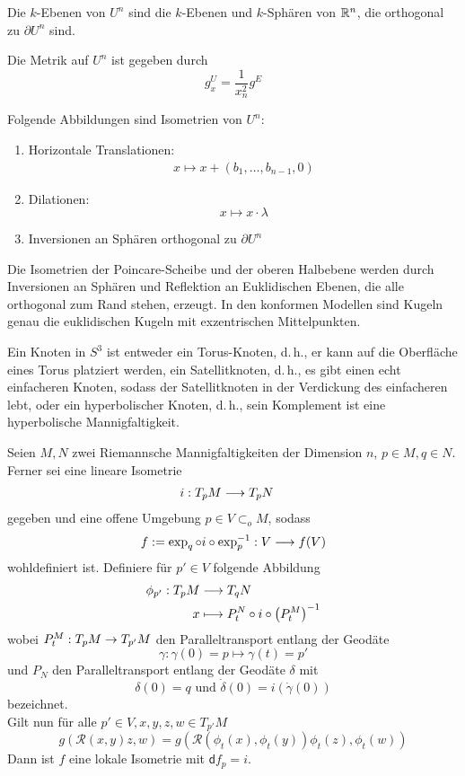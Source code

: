 \documentclass{book}
\renewcommand{\i}{^{-1}}
\renewcommand{\d}{\textsf{d}}
\newcommand{\Rc}{\mathcal{R}}
\begin{document}
\Prop{}
Die $k$-Ebenen von $U^n$ sind die $k$-Ebenen und $k$-Sphären von $\mathbb{R}^n$, die orthogonal zu $\partial U^n$ sind.

\Prop{}
Die Metrik auf $U^n$ ist gegeben durch
\[ g_x^U =  \frac{1}{x_n^2} g^E \]


\Prop{}
Folgende Abbildungen sind Isometrien von $U^n$:
\begin{enumerate}[1.)]
\item Horizontale Translationen:
\begin{align*}
x \longmapsto x + (b_1,\ldots, b_{n-1}, 0)
\end{align*}
\item Dilationen:
\[ x \longmapsto x \cdot \lambda \]
\item Inversionen an Sphären orthogonal zu $\partial U^n$
\end{enumerate}

\Prop{}
Die Isometrien der Poincare-Scheibe und der oberen Halbebene werden durch Inversionen an Sphären und Reflektion an Euklidischen Ebenen, die alle orthogonal zum Rand stehen, erzeugt.
\Prop{}
In den konformen Modellen sind Kugeln genau die euklidischen Kugeln mit exzentrischen Mittelpunkten.

Ein Knoten in $S^3$ ist entweder ein Torus-Knoten, d.\,h., er kann auf die Oberfläche eines Torus platziert werden, ein Satellitknoten, d.\,h., es gibt einen echt einfacheren Knoten, sodass der Satellitknoten in der Verdickung des einfacheren lebt, oder ein hyperbolischer Knoten, d.\,h., sein Komplement ist eine hyperbolische Mannigfaltigkeit.

Seien $M,N$ zwei Riemannsche Mannigfaltigkeiten der Dimension $n$, $p \in M, q \in N$. Ferner sei eine lineare Isometrie
\begin{align*}
i : T_pM & \overset{}{\longrightarrow} T_pN
\end{align*}
gegeben und eine offene Umgebung $p \in V\subset_o M$, sodass
\begin{align*}
f:= \exp_q \circ i \circ \exp_p\i : V \Pfeil{} f(V)
\end{align*}
wohldefiniert ist. Definiere für $p'\in V$ folgende Abbildung
\begin{align*}
\phi_{p'} : T_pM & \Pfeil{} T_qN\\
x &\longmapsto P^N_t \circ i \circ \klam{P^M_t}\i
\end{align*}
wobei $P_t^M : T_pM \overset{}{\rightarrow} T_{p'}M$ den Paralleltransport entlang der Geodäte 
\[\gamma : \gamma(0) = p \mapsto \gamma(t) =  p'\]
und $P_N$ den Paralleltransport entlang der Geodäte $\delta$ mit
\[ \delta(0) = q \text{ und } \dot{\delta}(0) = i(\dot{\gamma}(0)) \]
bezeichnet.\\
Gilt nun für alle $p'\in V,x,y,z,w \in T_{p'}M$
\[ g(\Rc(x,y)z, w) = g(\Rc(\phi_t(x), \phi_t(y)) \phi_t(z),\phi_t(w)) \]
Dann ist $f$ eine lokale Isometrie mit $\d f_p = i$.
\end{document}

